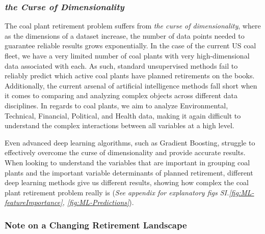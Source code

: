 \subsubsection{\textit{the Curse of Dimensionality}}

The coal plant retirement problem suffers from \textit{the curse of dimensionality}, where as the dimensions of a dataset 
increase, the number of data points needed to guarantee reliable results grows exponentially. In the case of the current US coal 
fleet, we have a very limited number of coal plants with very high-dimensional data associated with each. As such, standard 
unsupervised methods fail to reliably predict which active coal plants have planned retirements on the books. Additionally, the 
current arsenal of artificial intelligence methods fall short when it comes to comparing and analyzing complex objects across different 
data disciplines. In regards to coal plants, we aim to analyze Environmental, Technical, Financial, Political, and Health data, making 
it again difficult to understand the complex interactions between all variables at a high level. 

Even advanced deep learning algorithms, 
such as Gradient Boosting, struggle to effectively overcome the curse of dimensionality and provide accurate results. When looking to 
understand the variables that are important in grouping coal plants and the important variable determinants of planned retirement, different deep learning methods give us 
different results, showing how complex the coal plant retirement problem really is (\textit{See appendix for explanatory figs SI.\ref{fig:ML-featureImportance}, \ref{fig:ML-Predictions}}).


\subsubsection{Note on a Changing Retirement Landscape}\label{subsec:changing-retirement-landscape}


